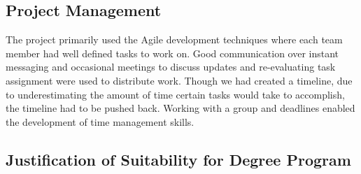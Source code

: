 \subsection{Project Management}
The project primarily used the Agile development techniques where each team member had well defined tasks to work on.
Good communication over instant messaging and occasional meetings to discuss updates and re-evaluating task assignment were used to distribute work.
Though we had created a timeline, due to underestimating the amount of time certain tasks would take to accomplish, the timeline had to be pushed back.
Working with a group and deadlines enabled the development of time management skills.
\subsection{Justification of Suitability for Degree Program}

